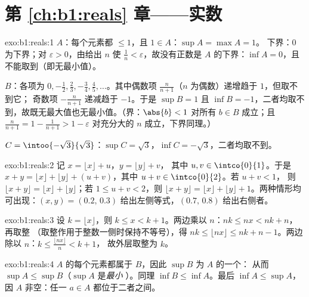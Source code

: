 \section*{第 \ref{ch:b1:reals} 章——实数}

\begin{solution}{exo:b1:reals:1}
$A$：每个元素都 $\leq 1$，且 $1 \in A$：$\sup A = \max A = 1$。
下界：$0$ 为下界；对 $\varepsilon > 0$，由给出 $n$ 使 $\frac 1n < \varepsilon$，故没有正数是
$A$ 的下界：$\inf A = 0$，且不能取到（即无最小值）。

$B$：各项为 $0, -\frac12, \frac23, -\frac34, \frac45, \dots$。其中偶数项
$\frac{n}{n+1}$（$n$ 为偶数）递增趋于 $1$，但取不到它；
奇数项 $-\frac{n}{n+1}$ 递减趋于 $-1$。于是 $\sup B = 1$ 且
$\inf B = -1$，二者均取不到，故既无最大值也无最小值。（界：$\abs{b}
< 1$ 对所有 $b \in B$ 成立；且 $\frac{n}{n+1} = 1 - \frac{1}{n+1} > 1 -
\varepsilon$ 对充分大的 $n$ 成立，下界同理。）

$C = \intoo{-\sqrt 3}{\sqrt 3}$：$\sup C = \sqrt 3$，$\inf C =
-\sqrt 3$，二者均取不到。
\end{solution}

\begin{solution}{exo:b1:reals:2}
记 $x = \lfloor x \rfloor + u$，$y = \lfloor y \rfloor + v$，
其中 $u, v \in \intco{0}{1}$。于是 $x + y = \lfloor x \rfloor + \lfloor y
\rfloor + (u + v)$，其中 $u + v \in \intco{0}{2}$。若 $u + v < 1$，
则 $\lfloor x + y\rfloor = \lfloor x\rfloor + \lfloor y \rfloor$；若
$1 \leq u + v < 2$，则 $\lfloor x+y \rfloor = \lfloor x \rfloor +
\lfloor y \rfloor + 1$。两种情形均可出现：$(x, y) = (0.2,\, 0.3)$
给出左侧等式，$(0.7,\, 0.8)$ 给出右侧者。
\end{solution}

\begin{solution}{exo:b1:reals:3}
设 $k = \lfloor x \rfloor$，则 $k \leq x < k + 1$。两边乘以
$n$：$nk \leq nx < nk + n$，再取整
（取整作用于整数一侧时保持不等号），得 $nk \leq \lfloor nx \rfloor \leq nk + n
- 1$。两边除以 $n$：$k \leq \frac{\lfloor nx \rfloor}{n} < k + 1$，
故外层取整为 $k$。
\end{solution}

\begin{solution}{exo:b1:reals:4}
$A$ 的每个元素都属于 $B$，因此 $\sup B$ 为 $A$ 的一个：
从而 $\sup A \leq \sup B$（$\sup A$ 是\emph{最小}
）。同理 $\inf B \leq \inf A$。最后 $\inf A \leq
\sup A$，因 $A$ 非空：任一 $a \in A$ 都位于二者之间。
\end{solution}

